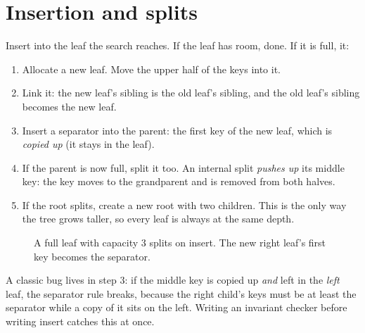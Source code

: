 \section{Insertion and splits}

Insert into the leaf the search reaches. If the leaf has room, done. If it is
full,  it:

\begin{enumerate}
\item Allocate a new leaf. Move the upper half of the keys into it.
\item Link it: the new leaf's sibling is the old leaf's sibling, and the old leaf's sibling becomes the new leaf.
\item Insert a separator into the parent: the first key of the new leaf, which is \emph{copied up} (it stays in the leaf).
\item If the parent is now full, split it too. An internal split \emph{pushes up} its middle key: the key moves to the grandparent and is removed from both halves.
\item If the root splits, create a new root with two children. This is the only way the tree grows taller, so every leaf is always at the same depth.
\end{enumerate}

\begin{figure}[ht]
\centering
{}
\caption{A full leaf with capacity 3 splits on insert. The new right leaf's first key becomes the separator.}
\label{fig:split}
\end{figure}

A classic bug lives in step 3: if the middle key is copied up \emph{and} left in
the \emph{left} leaf, the separator rule breaks, because the right child's keys
must be at least the separator while a copy of it sits on the left. Writing an
invariant checker before writing insert catches this at once.

